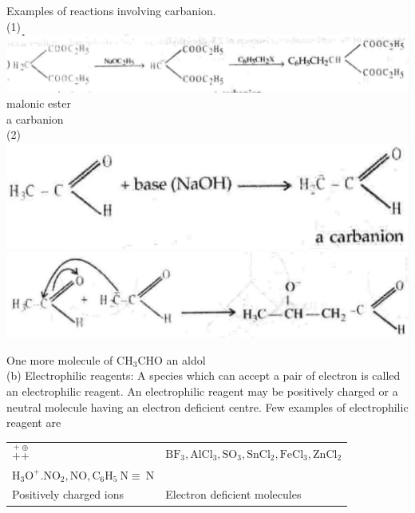 \documentclass[10pt]{article}
\begin{document}
Examples of reactions involving carbanion.\\
(1)\\
\includegraphics[max width=\textwidth, center]{2025_01_28_8470952b98110cec3aabg-121(3)}\\
malonic ester\\
a carbanion\\
(2)\\
\includegraphics[max width=\textwidth, center]{2025_01_28_8470952b98110cec3aabg-121(1)}\\
\includegraphics[max width=\textwidth, center]{2025_01_28_8470952b98110cec3aabg-121(2)}

One more molecule of $\mathrm{CH}_{3} \mathrm{CHO}$ an aldol\\
(b) Electrophilic reagents: A species which can accept a pair of electron is called an electrophilic reagent. An electrophilic reagent may be positively charged or a neutral molecule having an electron deficient centre. Few examples of electrophilic reagent are

\begin{center}
\begin{tabular}{ll}
$\stackrel{+}{+} \stackrel{\oplus}{+}$ & $\mathrm{BF}_{3}, \mathrm{AlCl}_{3}, \mathrm{SO}_{3}, \mathrm{SnCl}_{2}, \mathrm{FeCl}_{3}, \mathrm{ZnCl}_{2}$ \\
$\mathrm{H}_{3} \mathrm{O}^{+} . \mathrm{NO}_{2}, \mathrm{NO}, \mathrm{C}_{6} \mathrm{H}_{5} \mathrm{~N} \equiv \mathrm{~N}$ &  \\
Positively charged ions & Electron deficient molecules \\
\end{tabular}
\end{center}
\end{document}
